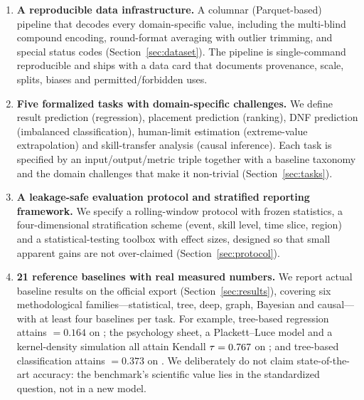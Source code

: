 \begin{enumerate}
  \item \textbf{A reproducible data infrastructure.} A columnar
        (Parquet-based) pipeline that decodes every domain-specific value,
        including the \wca{} multi-blind compound encoding, round-format
        averaging with outlier trimming, and special status codes
        (Section~\ref{sec:dataset}). The pipeline is single-command
        reproducible and ships with a data card that documents provenance,
        scale, splits, biases and permitted/forbidden uses.

  \item \textbf{Five formalized tasks with domain-specific challenges.} We
        define  result prediction (regression),  placement
        prediction (ranking),  DNF prediction (imbalanced
        classification),  human-limit estimation (extreme-value
        extrapolation) and  skill-transfer analysis (causal
        inference). Each task is specified by an input/output/metric triple
        together with a baseline taxonomy and the domain challenges that make
        it non-trivial (Section~\ref{sec:tasks}).

  \item \textbf{A leakage-safe evaluation protocol and stratified
        reporting framework.} We specify a rolling-window protocol with
        frozen statistics, a four-dimensional stratification scheme (event,
        skill level, time slice, region) and a statistical-testing toolbox
        with effect sizes, designed so that small apparent gains are not
        over-claimed (Section~\ref{sec:protocol}).

  \item \textbf{21 reference baselines with real measured numbers.} We report
        actual baseline results on the official export
        (Section~\ref{sec:results}), covering six methodological
        families---statistical, tree, deep, graph, Bayesian and causal---with at
        least four baselines per task. For example, tree-based regression
        attains \maelog{} $=0.164$ on ; the \wca{} psychology sheet, a
        Plackett--Luce model and a kernel-density simulation all attain Kendall
        $\tau=0.767$ on ; and tree-based classification attains
        \aucpr{} $=0.373$ on . We deliberately do not claim
        state-of-the-art accuracy: the benchmark's scientific value lies in the
        standardized question, not in a new model.
\end{enumerate}

